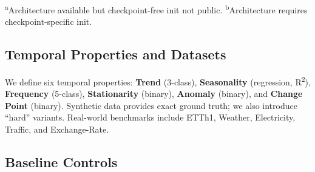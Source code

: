 \documentclass{article}
\begin{document}
\begin{table}[t!]
\caption{Extraction and reduction protocol by model family. Cross-family comparisons are valid only at the level of these standardized views, not raw hidden states. \emph{Confirmatory benchmark result.}}
\label{tab:extraction_protocol}
\centering
{}
\vspace{1pt}
{\scriptsize \textsuperscript{a}Architecture available but checkpoint-free init not public. \textsuperscript{b}Architecture requires checkpoint-specific init.}
\end{table}

\subsection{Temporal Properties and Datasets}

We define six temporal properties: \textbf{Trend} (3-class), \textbf{Seasonality} (regression, R\textsuperscript{2}), \textbf{Frequency} (5-class), \textbf{Stationarity} (binary), \textbf{Anomaly} (binary), and \textbf{Change Point} (binary). Synthetic data provides exact ground truth; we also introduce ``hard'' variants. Real-world benchmarks include ETTh1, Weather, Electricity, Traffic, and Exchange-Rate.

\subsection{Baseline Controls}
\end{document}
